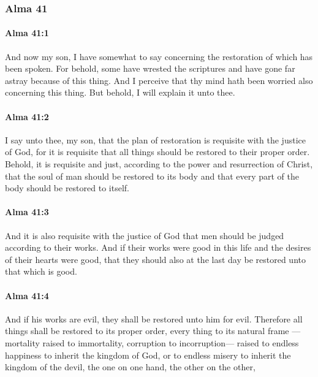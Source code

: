 	\subsubsection{Alma 41} %
		\label{ALMA-41}
		
		\paragraph{Alma 41:1} %
			\label{ALMA-41-1}

			And now my son, I have somewhat to say
			concerning the restoration of which has been spoken.
			For behold, some have wrested the scriptures
			and have gone far astray because of this thing.
			And I perceive that thy mind hath been worried also concerning this thing.
			But behold, I will explain it unto thee.

		\paragraph{Alma 41:2} %
			\label{ALMA-41-2}

			I say unto thee, my son,
			that the plan of restoration is requisite with the justice of God,
			for it is requisite that all things should be restored to their proper order.
			Behold, it is requisite and just, according to the power and resurrection of Christ,
			that the soul of man should be restored to its body
			and that every part of the body should be restored to itself.

		\paragraph{Alma 41:3} %
			\label{ALMA-41-3}

			And it is also requisite with the justice of God
			that men should be judged according to their works.
			And if their works were good in this life
			and the desires of their hearts were good,
			that they should also at the last day be restored unto that which is good.

		\paragraph{Alma 41:4} %
			\label{ALMA-41-4}

			And if his works are evil,
			they shall be restored unto him for evil.
			Therefore all things shall be restored to its proper order,
			every thing to its natural frame
			---mortality raised to immortality,
			corruption to incorruption---
			raised to endless happiness to inherit the kingdom of God,
			or to endless misery to inherit the kingdom of the devil,
			the one on one hand, the other on the other,

